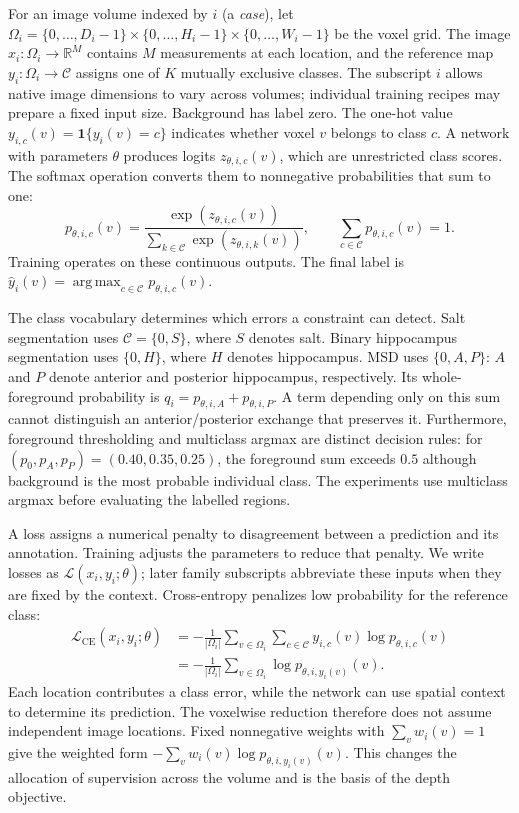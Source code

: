 \documentclass[12pt,a4paper]{article}
\begin{document}
For an image volume indexed by $i$ (a \emph{case}), let
$\Omega_i=\{0,\ldots,D_i-1\}\times\{0,\ldots,H_i-1\}\times
\{0,\ldots,W_i-1\}$ be the voxel grid. The image
$x_i:\Omega_i\to\mathbb R^M$ contains $M$ measurements at each location,
and the reference map $y_i:\Omega_i\to\mathcal C$ assigns one of $K$
mutually exclusive classes. The subscript $i$ allows native image dimensions
to vary across volumes; individual training recipes may prepare a fixed
input size. Background has label zero. The one-hot value
$y_{i,c}(v)=\mathbf1\{y_i(v)=c\}$ indicates whether voxel $v$ belongs to
class $c$. A network with parameters $\theta$ produces logits
$z_{\theta,i,c}(v)$, which are unrestricted class scores. The softmax
operation converts them to nonnegative probabilities that sum to one:
\begin{equation}
p_{\theta,i,c}(v)=
\frac{\exp(z_{\theta,i,c}(v))}
{\sum_{k\in\mathcal{C}}\exp(z_{\theta,i,k}(v))},
\qquad
\sum_{c\in\mathcal{C}}p_{\theta,i,c}(v)=1.
\label{eq:segmentation-softmax}
\end{equation}
Training operates on these continuous outputs. The final label is
$\widehat y_i(v)=\operatorname{arg\,max}_{c\in\mathcal C}
p_{\theta,i,c}(v)$. 

The class vocabulary determines which errors a constraint can detect.
Salt segmentation uses $\mathcal C=\{0,S\}$, where $S$ denotes salt.
Binary hippocampus segmentation uses $\{0,H\}$, where $H$ denotes
hippocampus. MSD uses $\{0,A,P\}$: $A$ and $P$ denote anterior and
posterior hippocampus, respectively. Its whole-foreground probability is
$q_i=p_{\theta,i,A}+p_{\theta,i,P}$. A term depending only on this sum
cannot distinguish an anterior/posterior exchange that preserves it.
Furthermore, foreground thresholding and multiclass argmax are distinct
decision rules: for $(p_0,p_A,p_P)=(0.40,0.35,0.25)$, the foreground sum
exceeds $0.5$ although background is the most probable individual class.
The experiments use multiclass argmax before evaluating the labelled
regions.

A loss assigns a numerical penalty to disagreement between a prediction
and its annotation. Training adjusts the parameters to reduce that
penalty. We write losses as $\mathcal L(x_i,y_i;\theta)$; later family
subscripts abbreviate these inputs when they are fixed by the context.
Cross-entropy penalizes low probability for the reference class:
\begin{equation}
\begin{aligned}
\mathcal{L}_{\mathrm{CE}}(x_i,y_i;\theta)
&=-\frac{1}{|\Omega_i|}\sum_{v\in\Omega_i}
  \sum_{c\in\mathcal{C}}y_{i,c}(v)\log p_{\theta,i,c}(v)\\
&=-\frac{1}{|\Omega_i|}\sum_{v\in\Omega_i}
  \log p_{\theta,i,y_i(v)}(v).
\end{aligned}
\label{eq:cross-entropy}
\end{equation}
Each location contributes a class error, while the network can use spatial
context to determine its prediction. The voxelwise reduction therefore
does not assume independent image locations. Fixed nonnegative weights
with $\sum_v w_i(v)=1$ give the weighted form
$-\sum_v w_i(v)\log p_{\theta,i,y_i(v)}(v)$. This changes the allocation
of supervision across the volume and is the basis of the depth objective.
\end{document}
